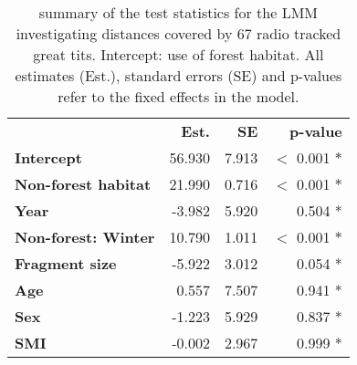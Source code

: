 \documentclass[10pt, twoside]{book} %
\begin{document}
	\begin{table}[b]
		\begin{center}
			\begin{footnotesize}
				\caption{summary of the test statistics for the LMM investigating distances covered by 67 radio tracked great tits. Intercept: use of forest habitat. All estimates (Est.), standard errors (SE) and p-values refer to the fixed effects in the model.}  \label{tab3-2}
				
				\begingroup
				\setlength{\tabcolsep}{8pt} %
				\renewcommand{\arraystretch}{1.5} %
				\begin{tabular}{l r r r}
					
					\toprule
					& \textbf{Est.} & \textbf{SE} & \textbf{p-value} \\ 
					\cmidrule(r){2-4}
					\textbf{Intercept} & 56.930 & 7.913 & $<$ 0.001 $\ast$\\
					\textbf{Non-forest habitat} & 21.990 & 0.716 & $<$ 0.001 $\ast$\\
					\textbf{Year} & -3.982 & 5.920 & 0.504 \color{white}*\color{black}\\
					\textbf{Non-forest: Winter} & 10.790 & 1.011 & $<$ 0.001 $\ast$\\
					\textbf{Fragment size} & -5.922 & 3.012 & 0.054 \color{white}*\color{black}\\
					\textbf{Age} & 0.557 & 7.507 & 0.941 \color{white}*\color{black}\\
					\textbf{Sex} & -1.223 & 5.929 & 0.837 \color{white}*\color{black}\\	
					\textbf{SMI} & -0.002 & 2.967 & 0.999 \color{white}*\color{black}\\	
					
					
					\bottomrule
				\end{tabular}\endgroup
			\end{footnotesize}
		\end{center}
	\end{table}
	
\end{document}
